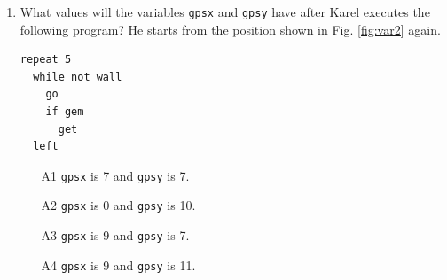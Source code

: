 \documentclass[article,A4,12pt]{llncs}
\begin{document}
{{{{\begin{enumerate}
\begin{enumerate}
\item[A1] {\tt gpsx} is 7 and {\tt gpsy} is 12.
\item[A2] {\tt gpsx} is 8 and {\tt gpsy} is 0.
\item[A3] {\tt gpsx} is 8 and {\tt gpsy} is 12.
\item[A4] {\tt gpsx} is 7 and {\tt gpsy} is 11.
\end{enumerate}
\item What values will the variables {\tt gpsx} and {\tt gpsy} have after
Karel executes the following program? He starts from the position shown 
in Fig. \ref{fig:var2} again.
\begin{verbatim}
repeat 5
  while not wall
    go
    if gem
      get
  left
\end{verbatim}
\begin{enumerate}
\item[A1] {\tt gpsx} is 7 and {\tt gpsy} is 7.
\item[A2] {\tt gpsx} is 0 and {\tt gpsy} is 10.
\item[A3] {\tt gpsx} is 9 and {\tt gpsy} is 7.
\item[A4] {\tt gpsx} is 9 and {\tt gpsy} is 11.
\end{enumerate}


\end{enumerate}}}}}
\end{document}
